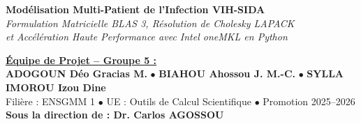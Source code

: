 \documentclass[aspectratio=169, 10pt, french]{beamer}
\begin{document}
\begin{frame}[plain]
    \begin{tcolorbox}[
        colback=navyblue,
        colframe=navyblue,
        arc=4pt,
        boxrule=0pt,
        width=0.96\textwidth,
        halign=center,
        top=4pt, bottom=4pt
    ]
        {\large\bfseries\color{white} Modélisation Multi-Patient de l'Infection VIH-SIDA}\\[0.08cm]
        {\small\color{goldaccent}\textit{Formulation Matricielle BLAS 3, Résolution de Cholesky LAPACK}}\\[0.03cm]
        {\small\color{goldaccent}\textit{et Accélération Haute Performance avec Intel oneMKL en Python}}
    \end{tcolorbox}

    \vspace{0.10cm}

    \begin{tcolorbox}[
        colback=cardbg,
        colframe=gray!30,
        arc=3pt,
        boxrule=0.6pt,
        width=0.96\textwidth,
        top=3pt, bottom=3pt
    ]
        \centering
        {\footnotesize \textbf{\textcolor{navyblue}{\underline{Équipe de Projet -- Groupe 5 :}}}}\\[0.05cm]
        {\footnotesize \textbf{ADOGOUN Déo Gracias M.} \quad $\bullet$ \quad \textbf{BIAHOU Ahossou J. M.-C.} \quad $\bullet$ \quad \textbf{SYLLA IMOROU Izou Dine}}\\[0.08cm]
        {\scriptsize Filière : ENSGMM 1 \quad $\bullet$ \quad UE : Outils de Calcul Scientifique \quad $\bullet$ \quad Promotion 2025--2026}\\[0.04cm]
        {\scriptsize \textbf{Sous la direction de : \textcolor{navyblue}{Dr. Carlos AGOSSOU}}}
    \end{tcolorbox}
\end{frame}

\end{document}
